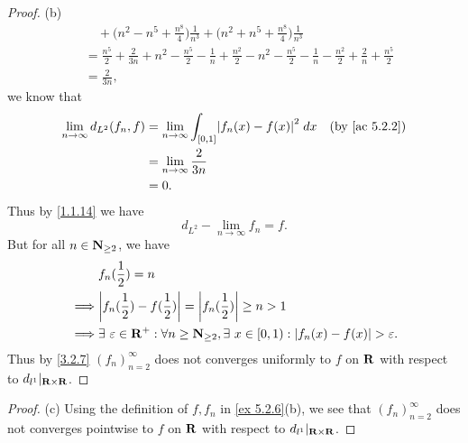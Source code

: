 \begin{proof}{(b)}
\begin{align*}
     & \quad + \bigg(n^2 - n^5 + \frac{n^8}{4}\bigg) \frac{1}{n^3} + \bigg(n^2 + n^5 + \frac{n^8}{4}\bigg) \frac{1}{n^3}                                                                                                                                                                                 \\
     & = \frac{n^5}{2} + \frac{2}{3n} + n^2 - \frac{n^5}{2} - \frac{1}{n} + \frac{n^2}{2} - n^2 - \frac{n^5}{2} - \frac{1}{n} - \frac{n^2}{2} + \frac{2}{n} + \frac{n^5}{2}                                                                                                                              \\
     & = \frac{2}{3n},
  \end{align*}
  we know that
  \begin{align*}
    \lim_{n \to \infty} d_{L^2}(f_n, f) & = \lim_{n \to \infty} \int_{[0, 1]} \abs{f_n(x) - f(x)}^2 \; dx & \text{(by \cref{ac 5.2.2})} \\
                                        & = \lim_{n \to \infty} \frac{2}{3n}                                                            \\
                                        & = 0.
  \end{align*}
  Thus by \cref{1.1.14} we have
  \[
    d_{L^2} - \lim_{n \to \infty} f_n = f.
  \]
  But for all \(n \in \mathbf{N}_{\geq 2}\), we have
  \begin{align*}
             & f_n(\frac{1}{2}) = n                                                                                                   \\
    \implies & \abs{f_n(\frac{1}{2}) - f(\frac{1}{2})} = \abs{f_n(\frac{1}{2})} \geq n > 1                                            \\
    \implies & \exists\ \varepsilon \in \R^+ : \forall n \geq \N_{\geq 2}, \exists\ x \in [0, 1) : \abs{f_n(x) - f(x)} > \varepsilon.
  \end{align*}
  Thus by \cref{3.2.7} \((f_n)_{n = 2}^\infty\) does not converges uniformly to \(f\) on \(\mathbf{R}\) with respect to \(d_{l^1}|_{\mathbf{R} \times \mathbf{R}}\).
\end{proof}

\begin{proof}{(c)}
  Using the definition of \(f, f_n\) in \cref{ex 5.2.6}(b), we see that \((f_n)_{n = 2}^\infty\) does not converges pointwise to \(f\) on \(\mathbf{R}\) with respect to \(d_{l^1}|_{\mathbf{R} \times \mathbf{R}}\).
\end{proof}

